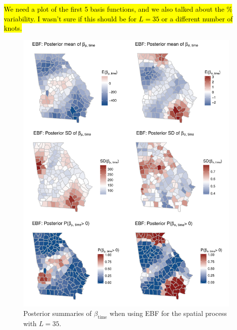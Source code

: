 \documentclass[11pt]{article}
\begin{document}
\hl{We need a plot of the first 5 basis functions, and we also talked about the \% variability. I wasn't sure if this should be for $L = 35$ or a different number of knots.}

\begin{figure}  %
  \centering
  \includegraphics[width=\linewidth]{plots/ebf-post-betatime.pdf}
  \caption{Posterior summaries of $\beta_{\text{time}}$ when using EBF for the spatial process with $L = 35$.}
  \label{ebfig:ebfpost}
\end{figure}
\end{document}
